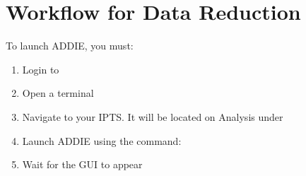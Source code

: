 \chapter{Workflow for Data Reduction}
To launch ADDIE, you must:
\begin{enumerate}
\item Login to \analysis
\item Open a terminal
\item Navigate to your IPTS. It will be located on Analysis under \iptsPrint
\item Launch ADDIE using the command: \addiecmd
\item Wait for the GUI to appear

\end{enumerate}





